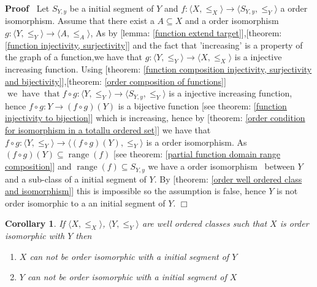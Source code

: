 \documentclass{book}
\newcommand{\tmop}[1]{\ensuremath{\operatorname{#1}}}
\newenvironment{proof}{\noindent\textbf{Proof\ }}{\hspace*{\fill}$\Box$\medskip}
\newtheorem{corollary}{Corollary}
\begin{document}
\begin{proof}
  Let $S_{Y, y}$ be a initial segment of $Y$ and $f : \langle X, \leqslant_X
  \rangle \rightarrow \langle S_{Y, y}, \leqslant_Y \rangle$ a order
  isomorphism. Assume that there exist a $A \subseteq X$ and a order
  isomorphism $g : \langle Y, \leqslant_Y \rangle \rightarrow \langle A,
  \leqslant_A \rangle$, As by [lemma: \ref{function extend target}],[theorem:
  \ref{function injectivity, surjectivity}] and the fact that 'increasing' is
  a property of the graph of a function,we have that $g : \langle Y,
  \leqslant_Y \rangle \rightarrow \langle X, \leqslant_X \rangle$ is a
  injective increasing function. Using [theorem: \ref{function composition
  injectivity, surjectivity and bijectivity}],[theorem: \ref{order composition
  of functions}] $\tmop{we} \tmop{have} \tmop{that} f \circ g : \langle Y,
  \leqslant_Y \rangle \rightarrow \langle S_{Y, y}, \leqslant_Y \rangle$ is a
  injective increasing function, hence $f \circ g : Y \rightarrow (f \circ g)
  (Y)$ is a bijective function [see theorem: \ref{function injectivity to
  bijection}] which is increasing, hence by [theorem: \ref{order condition for
  isomorphism in a totallu ordered set}] we have that $f \circ g : \langle Y,
  \leqslant_Y \rangle \rightarrow \langle (f \circ g) (Y), \leqslant_Y
  \rangle$ is a order isomorphism. As $(f \circ g) (Y) \subseteq \tmop{range}
  (f)$ [see theorem: \ref{partial function domain range composition}] and
  $\tmop{range} (f) \subseteq S_{Y, y}$ we have a order isomorphism \ between
  $Y$ and a sub-class of a initial segment of $Y$. By [theorem: \ref{order
  well ordered class and isomorphism}] this is impossible so the assumption is
  false, hence $Y$ is not order isomorphic to a an initial segment of $Y$.
\end{proof}

\begin{corollary}
  \label{order well ordered isomorphic property (3)}If $\langle X, \leqslant_X
  \rangle$, $\langle Y, \leqslant_Y \rangle$ are well ordered classes such
  that $X$ is order isomorphic with $Y$ then
  \begin{enumerate}
    \item $X$ can not be order isomorphic with a initial segment of $Y$
    
    \item $Y$ can not be order isomorphic with a initial segment of $X$
  \end{enumerate}
\end{corollary}
\end{document}
